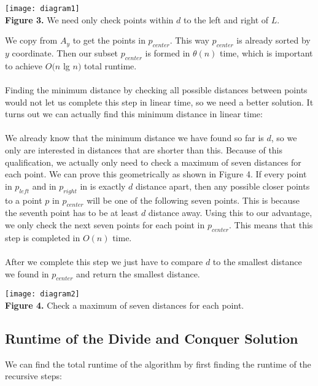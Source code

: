 \documentclass[12pt]{report}
\begin{document}
\begin{center}
\texttt{[image: diagram1]}
\\\textbf{Figure 3.} We need only check points within $d$ to the left and right of $L$.
\end{center}
We copy from $A_y$ to get the points in $p_{center}$. This way $p_{center}$ is already sorted by $y$ coordinate. Then our subset $p_{center}$ is formed in $\theta{(n)}$ time, which is important 
to achieve $O(n$ lg $n)$ total runtime.
\\\\
Finding the minimum distance by checking all possible distances between points would not let us complete this step in linear time, so we need a better solution. 
It turns out we can actually find this minimum distance in linear time:
\\\\
We already know that the minimum distance we have found so far is $d$, so we only are interested in distances that are shorter than this. Because of this 
qualification, we actually only need to check a maximum of seven distances for each point. We can prove this geometrically as shown in Figure 4. If every 
point in $p_{left}$ and in $p_{right}$ in is exactly $d$ distance apart, then any possible closer points to a point $p$ in $p_{center}$ will be one of the following seven points. 
This is because the seventh point has to be at least $d$ distance away. Using this to our advantage, we only check the next seven points for each point in $p_{center}$. 
This means that this step is completed in $O(n)$ time.
\\\\
After we complete this step we just have to compare $d$ to the smallest distance we found in $p_{center}$ and return the smallest distance.

\begin{center}
\texttt{[image: diagram2]}
\\\textbf{Figure 4.} Check a maximum of seven distances for each point.
\end{center}

\subsection*{Runtime of the Divide and Conquer Solution}
We can find the total runtime of the algorithm by first finding the runtime of the recursive steps:
\end{document}
